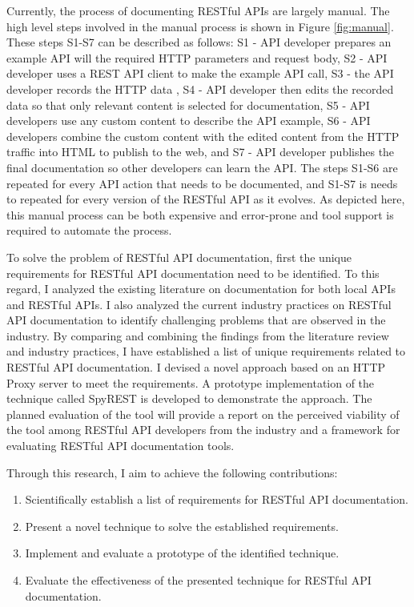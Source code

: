 \documentclass[11pt,oneside]{book}
\begin{document}
Currently, the process of documenting RESTful APIs are largely manual. The high level steps involved in the manual process is shown in Figure \ref{fig:manual}. These steps S1-S7 can be described as follows: S1 - API developer prepares an example API will the required HTTP parameters and request body, S2 - API developer uses a REST API client to make the example API call, S3 - the API developer records the HTTP data , S4 - API developer then edits the recorded data so that only relevant content is selected for documentation, S5 - API developers use any custom content to describe the API example, S6 - API developers combine the custom content with the edited content from the HTTP traffic into HTML to publish to the web, and S7 - API developer publishes the final documentation so other developers can learn the API. The steps S1-S6 are repeated for every API action that needs to be documented, and S1-S7 is needs to repeated for every version of the RESTful API as it evolves. As depicted here, this manual process can be both expensive and error-prone and tool support is required to automate the process.

To solve the problem of RESTful API documentation, first the unique requirements for RESTful API documentation need to be identified. To this regard, I analyzed the existing literature on documentation for both local APIs and RESTful APIs. I also analyzed the current industry practices on RESTful API documentation to identify challenging problems that are observed in the industry. By comparing and combining the findings from the literature review and industry practices, I have established a list of unique requirements related to RESTful API documentation. I devised a novel approach based on an HTTP Proxy server to meet the requirements. A prototype implementation of the technique called SpyREST is developed to demonstrate the approach. The planned evaluation of the tool will provide a report on the perceived viability of the tool among RESTful API developers from the industry and a framework for evaluating RESTful API documentation tools.

Through this research, I aim to achieve the following contributions:
\begin{enumerate}
  \item Scientifically establish a list of requirements for RESTful API documentation.
  \item Present a novel technique to solve the established requirements.
  \item Implement and evaluate a prototype of the identified technique.
  \item Evaluate the effectiveness of the presented technique for RESTful API documentation.
\end{enumerate}
\end{document}
